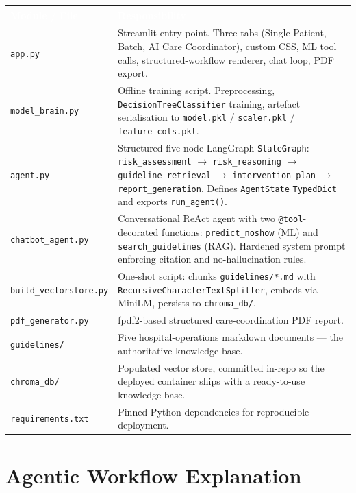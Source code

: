 \documentclass[11pt,a4paper]{article}
\newcommand{\hdrrow}[1]{\textcolor{white}{\textbf{#1}}}
\newcommand{\hdrline}{\rowcolor{navy}}
\begin{document}
\begin{tabularx}{\textwidth}{|>{\hsize=0.32\hsize}X|X|}
\hline
\hdrline \hdrrow{Module / File} & \hdrrow{Responsibility} \\ \hline
\texttt{app.py}                 & Streamlit entry point. Three tabs (Single Patient, Batch, AI Care Coordinator), custom CSS, ML tool calls, structured-workflow renderer, chat loop, PDF export. \\ \hline
\texttt{model\_brain.py}        & Offline training script. Preprocessing, \texttt{DecisionTreeClassifier} training, artefact serialisation to \texttt{model.pkl} / \texttt{scaler.pkl} / \texttt{feature\_cols.pkl}. \\ \hline
\texttt{agent.py}               & Structured five-node LangGraph \texttt{StateGraph}: \texttt{risk\_assessment} $\to$ \texttt{risk\_reasoning} $\to$ \texttt{guideline\_retrieval} $\to$ \texttt{intervention\_plan} $\to$ \texttt{report\_generation}. Defines \texttt{AgentState} \texttt{TypedDict} and exports \texttt{run\_agent()}. \\ \hline
\texttt{chatbot\_agent.py}      & Conversational ReAct agent with two \texttt{@tool}-decorated functions: \texttt{predict\_noshow} (ML) and \texttt{search\_guidelines} (RAG). Hardened system prompt enforcing citation and no-hallucination rules. \\ \hline
\texttt{build\_vectorstore.py}  & One-shot script: chunks \texttt{guidelines/*.md} with \texttt{RecursiveCharacterTextSplitter}, embeds via MiniLM, persists to \texttt{chroma\_db/}. \\ \hline
\texttt{pdf\_generator.py}      & fpdf2-based structured care-coordination PDF report. \\ \hline
\texttt{guidelines/}            & Five hospital-operations markdown documents --- the authoritative knowledge base. \\ \hline
\texttt{chroma\_db/}            & Populated vector store, committed in-repo so the deployed container ships with a ready-to-use knowledge base. \\ \hline
\texttt{requirements.txt}       & Pinned Python dependencies for reproducible deployment. \\ \hline
\end{tabularx}

\section{Agentic Workflow Explanation}\label{sec:workflow}
\end{document}
